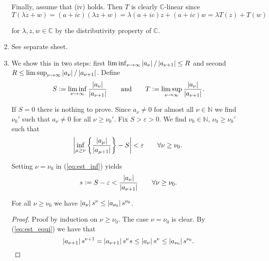 \begin{enumerate}[label = \textbf{Exercise \arabic*.},wide = 0pt, itemsep=1.5ex]
		Finally, assume that (iv) holds. Then $T$ is clearly $\mathbb{C}$-linear since 
		\begin{equation}
			T(\lambda z + w) = (a + ic)(\lambda z + w) = \lambda(a + ic)z + (a + ic)w = \lambda T(z) + T(w)
		\end{equation}

		\noindent for $\lambda,z,w \in \mathbb{C}$ by the distributivity property of $\mathbb{C}$.

	\item See separate sheet.

	\item We show this in two steps: first $\liminf_{\nu \to \infty}\abs[0]{a_\nu}/\abs[0]{a_{\nu + 1}} \leq R$ and second $R \leq \limsup_{\nu \to \infty}\abs[0]{a_\nu}/\abs[0]{a_{\nu + 1}}$. Define 
		\begin{equation}
			S := \liminf_{\nu \to \infty}\frac{\abs[0]{a_\nu}}{\abs[0]{a_{\nu + 1}}} \qquad \text{and} \qquad T := \limsup_{\nu \to \infty}\frac{\abs[0]{a_\nu}}{\abs[0]{a_{\nu + 1}}}.
		\end{equation}

		If $S = 0$ there is nothing to prove. Since $a_\nu \neq 0$ for almost all $\nu \in \mathbb{N}$ we find $\nu_0'$ such that $a_\nu \neq 0$ for all $\nu \geq \nu_0'$. Fix $S > \varepsilon > 0$. We find $\nu_0 \in \mathbb{N}$, $\nu_0 \geq \nu_0'$ such that
		\begin{equation}
			\abs[3]{\inf_{\mu \geq \nu}\cbr[3]{\frac{\abs[0]{a_\mu}}{\abs[0]{a_{\mu + 1}}}} - S} < \varepsilon \qquad \forall \nu \geq \nu_0.
			\label{eq:est_inf}
		\end{equation}

		Setting $\nu = \nu_0$ in (\ref{eq:est_inf}) yields 
		\begin{equation}
			s := S - \varepsilon < \frac{\abs[0]{a_\nu}}{\abs[0]{a_{\nu + 1}}}  \qquad \forall \nu \geq \nu_0.
			\label{eq:est_equi}
		\end{equation}

		\begin{lemma}
			For all $\nu \geq \nu_0$ we have $\abs[0]{a_\nu}s^\nu \leq \abs[0]{a_{\nu_0}}s^{\nu_0}$.
			\label{lem:ind}
		\end{lemma}

		\begin{proof}
			Proof by induction on $\nu \geq \nu_0$. The case $\nu = \nu_0$ is clear. By (\ref{eq:est_equi}) we have that
			\begin{equation}
				\abs[0]{a_{\nu + 1}}s^{\nu + 1} = 	\abs[0]{a_{\nu + 1}}s^{\nu}s \leq \abs[0]{a_\nu}s^\nu \leq \abs[0]{a_{\nu_0}}s^{\nu_0}.  
			\end{equation}
		\end{proof}


\end{enumerate}
